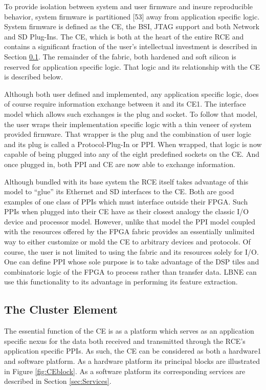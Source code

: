 To provide isolation between system and user firmware and insure reproducible behavior, system firmware is partitioned [53] away from application specific logic. System firmware is defined as the CE, the BSI, JTAG support and both Network and SD Plug-Ins.
The CE, which is both at the heart of the entire RCE and contains a significant fraction of the user's intellectual investment is described in Section \ref{sec:CE}. The remainder of the fabric, both hardened and soft silicon is reserved for application specific logic. That logic and its relationship with the CE is described below.

Although both user defined and implemented, any application specific logic, does of course require information exchange between it and its CE1. The interface model which allows such exchanges is the plug and socket. To follow that model, the user wraps their implementation specific logic with a thin veneer of system provided firmware. That wrapper is the plug and the combination of user logic and its plug is called a Protocol-Plug-In or PPI. When wrapped, that logic is now capable of being plugged into any of the eight predefined sockets on the CE. And once plugged in, both PPI and CE are now able to exchange information.

Although bundled with its base system the RCE itself takes advantage of this model to “glue” its Ethernet and SD interfaces to the CE. Both are good examples of one class of PPIs which must interface outside their FPGA.  Such PPIs when plugged into their CE have as their closest analogy the classic I/O device and processor model. However, unlike that model the PPI model coupled with the resources offered by the FPGA fabric provides an essentially unlimited way to either customize or mold the CE to arbitrary devices and protocols. Of course, the user is not limited to using the fabric and its resources solely for I/O. One can define PPI whose sole purpose is to take advantage of the DSP tiles and combinatoric logic of the FPGA to process rather than transfer data. LBNE can use this functionality to its advantage in performing its feature extraction.

\subsection{The Cluster Element}
\label{sec:CE}
The essential function of the CE is as a platform which serves as an application specific nexus for the data both received and transmitted through the RCE's application specific PPIs. As such, the CE can be considered as both a hardware1 and software platform. As a hardware platform its principal blocks are illustrated in Figure \ref{fig:CEblock}. As a software platform its corresponding services are described in Section \ref{sec:Services}.


